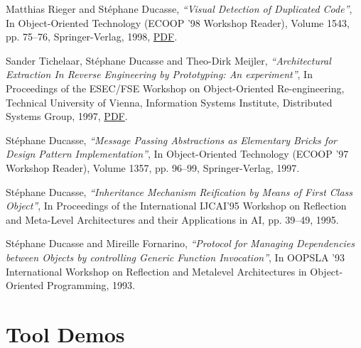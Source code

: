 \documentclass{article}
\newcommand{\czauthors}[1]{#1}
\newcommand{\cztitle}[1]{\emph{``#1''}}
\newcommand{\czbooktitle}[1]{#1}
\begin{document}
\begin{itemize}
	\pub  \czauthors{Matthias Rieger and St\'ephane Ducasse},  \cztitle{Visual Detection of Duplicated Code},  In \czbooktitle{Object-Oriented Technology (ECOOP '98 Workshop Reader)}, Volume 1543, pp. 75--76, Springer-Verlag, 1998, \href{http://rmod-files.lille.inria.fr/Team/Texts/Papers/Rieg98aEcoopWorkshop.pdf}{PDF}.

	\pub  \czauthors{Sander Tichelaar, St\'ephane Ducasse and Theo-Dirk Meijler},  \cztitle{Architectural Extraction In Reverse Engineering by Prototyping: An experiment},  In \czbooktitle{Proceedings of the ESEC/FSE Workshop on Object-Oriented Re-engineering}, Technical University of Vienna, Information Systems Institute, Distributed Systems Group, 1997, \href{http://rmod-files.lille.inria.fr/Team/Texts/Papers/Tich97bArchExtraction.pdf}{PDF}.

	\pub  \czauthors{St\'ephane Ducasse},  \cztitle{Message Passing Abstractions as Elementary Bricks for Design Pattern Implementation},  In \czbooktitle{Object-Oriented Technology (ECOOP '97 Workshop Reader)}, Volume 1357, pp. 96--99, Springer-Verlag, 1997.

	\pub  \czauthors{St\'ephane Ducasse},  \cztitle{Inheritance Mechanism Reification by Means of First Class Object},  In \czbooktitle{Proceedings of the International IJCAI'95 Workshop on Reflection and Meta-Level Architectures and their Applications in AI}, pp. 39--49, 1995.

	\pub  \czauthors{St\'ephane Ducasse and Mireille Fornarino},  \cztitle{Protocol for Managing Dependencies between Objects by controlling Generic Function Invocation},  In \czbooktitle{OOPSLA '93 International Workshop on Reflection and Metalevel Architectures in Object-Oriented Programming}, 1993.

\end{itemize}\section{Tool Demos}
\end{document}
